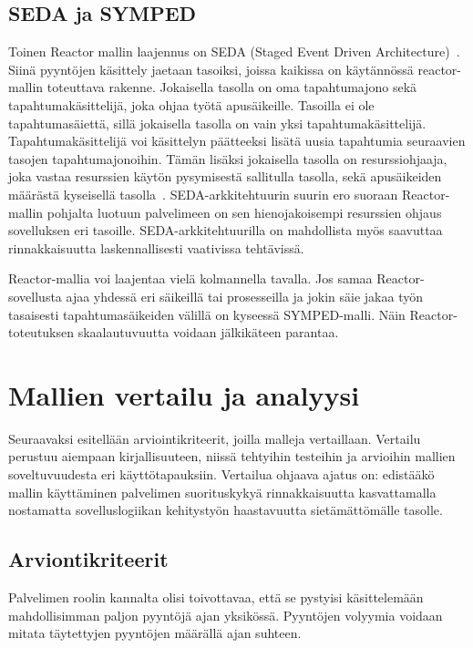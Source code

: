 \documentclass[finnish]{tktltiki2}
\theoremstyle{definition}
\theoremstyle{remark}
\begin{document}
\subsection{SEDA ja SYMPED}

Toinen Reactor mallin laajennus on SEDA (Staged Event Driven Architecture)~\cite{welsh_seda_2001}.
Siinä pyyntöjen käsittely jaetaan tasoiksi, joissa kaikissa on
käytännössä reactor-mallin toteuttava rakenne. Jokaisella tasolla
on oma tapahtumajono sekä tapahtumakäsittelijä, joka ohjaa työtä
apusäikeille. Tasoilla ei ole tapahtumasäiettä, sillä
jokaisella tasolla on vain yksi tapahtumakäsittelijä.
Tapahtumakäsittelijä voi käsittelyn päätteeksi
lisätä uusia tapahtumia seuraavien tasojen tapahtumajonoihin.
Tämän lisäksi jokaisella tasolla on resurssiohjaaja,
joka vastaa resurssien käytön pysymisestä sallitulla tasolla,
sekä apusäikeiden määrästä kyseisellä tasolla~\cite{welsh_seda_2001}.
SEDA-arkkitehtuurin suurin ero suoraan Reactor-mallin pohjalta luotuun
palvelimeen on sen hienojakoisempi resurssien ohjaus sovelluksen eri tasoille.
SEDA-arkkitehtuurilla on mahdollista myös saavuttaa rinnakkaisuutta
laskennallisesti vaativissa tehtävissä.

Reactor-mallia voi laajentaa vielä kolmannella tavalla.
Jos samaa Reactor-sovellusta ajaa yhdessä eri säikeillä tai prosesseilla
ja jokin säie jakaa työn tasaisesti tapahtumasäikeiden välillä
on kyseessä SYMPED-malli. Näin Reactor-toteutuksen
skaalautuvuutta voidaan jälkikäteen parantaa.

\section{Mallien vertailu ja analyysi}\label{sec:vertailu}
Seuraavaksi esitellään arviointikriteerit,
joilla malleja vertaillaan.
Vertailu perustuu aiempaan kirjallisuuteen, niissä
tehtyihin testeihin ja arvioihin
mallien soveltuvuudesta eri
käyttötapauksiin.
Vertailua ohjaava ajatus on:
edistääkö mallin käyttäminen palvelimen
suorituskykyä rinnakkaisuutta kasvattamalla
nostamatta sovelluslogiikan kehitystyön haastavuutta
sietämättömälle tasolle.

\subsection{Arviontikriteerit}

Palvelimen roolin kannalta olisi toivottavaa, että
se pystyisi käsittelemään mahdollisimman paljon pyyntöjä
ajan yksikössä. Pyyntöjen volyymia voidaan
mitata täytettyjen pyyntöjen määrällä ajan suhteen.
\end{document}
